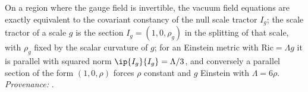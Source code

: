 On a region where the gauge field is invertible, the vacuum field equations are exactly equivalent to the covariant constancy of the null scale tractor $I_g$; the scale tractor of a scale $g$ is the section $I_g = (1, 0, \rho_g)$ in the splitting of that scale, with $\rho_g$ fixed by the scalar curvature of $g$; for an Einstein metric with $\mathrm{Ric} = \Lambda g$ it is parallel with squared norm $\ip{I_g}{I_g} = \Lambda/3$, and conversely a parallel section of the form $(1,0,\rho)$ forces $\rho$ constant and $g$ Einstein with $\Lambda = 6\rho$. \emph{Provenance:} \cite[Thm.~4.5, Thm.~4.7]{ButlerT6}.
